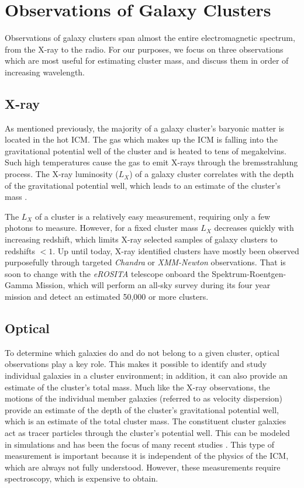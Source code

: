 \section{Observations of Galaxy Clusters}
Observations of galaxy clusters span almost the entire electromagnetic spectrum, from the X-ray to the radio. For our purposes, we focus on three observations which are most useful for estimating cluster mass, and discuss them in order of increasing wavelength.

\subsection{X-ray}
As mentioned previously, the majority of a galaxy cluster's baryonic matter is located in the hot ICM. The gas which makes up the ICM is falling into the gravitational potential well of the cluster and is heated to tens of megakelvins. Such high temperatures cause the gas to emit X-rays through the bremsstrahlung process. The X-ray luminosity ($L_X$) of a galaxy cluster correlates with the depth of the gravitational potential well, which leads to an estimate of the cluster's mass . 

The $L_X$ of a cluster is a relatively easy measurement, requiring only a few photons to measure. However, for a fixed cluster mass $L_X$ decreases quickly with increasing redshift, which limits X-ray selected samples of galaxy clusters to redshifts $< 1$. Up until today, X-ray identified clusters have mostly been observed purposefully through targeted \textit{Chandra} or \textit{XMM-Newton} observations. That is soon to change with the \textit{eROSITA} \citep{Pillepich2012} telescope onboard the Spektrum-Roentgen-Gamma Mission, which will perform an all-sky survey during its four year mission and detect an estimated 50,000 or more clusters.

\subsection{Optical}
To determine which galaxies do and do not belong to a given cluster, optical observations play a key role. This makes it possible to identify and study individual galaxies in a cluster environment; in addition, it can also provide an estimate of the cluster's total mass. Much like the X-ray observations, the motions of the individual member galaxies (referred to as velocity dispersion) provide an estimate of the depth of the cluster's gravitational potential well, which is an estimate of the total cluster mass. The constituent cluster galaxies act as tracer particles through the cluster's potential well. This can be modeled in simulations and has been the focus of many recent studies . This type of measurement is important because it is independent of the physics of the ICM, which are always not fully understood. However, these measurements require spectroscopy, which is expensive to obtain. 

